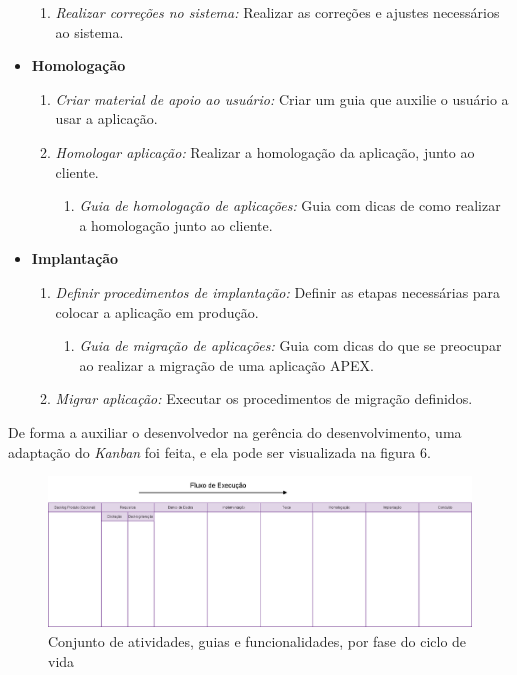 \begin{itemize}
\begin{enumerate}
\item \textit{Realizar correções no sistema:} Realizar as correções e ajustes necessários ao sistema.
\end{enumerate}
\item \textbf{Homologação}
\begin{enumerate}
\item \textit{Criar material de apoio ao usuário:} Criar um guia que auxilie o usuário a usar a aplicação.
\item \textit{Homologar aplicação:} Realizar a homologação da aplicação, junto ao cliente.
\begin{enumerate}
\item \textit{Guia de homologação de aplicações:} Guia com dicas de como realizar a homologação junto ao cliente.
\end{enumerate}
\end{enumerate}
\item \textbf{Implantação}
\begin{enumerate}
\item \textit{Definir procedimentos de implantação:} Definir as etapas necessárias para colocar a aplicação em produção.
\begin{enumerate}
\item \textit{Guia de migração de aplicações:} Guia com dicas do que se preocupar ao realizar a migração de uma aplicação APEX.
\end{enumerate}
\item \textit{Migrar aplicação:} Executar os procedimentos de migração definidos.
\end{enumerate}
\end{itemize}
De forma a auxiliar o desenvolvedor na gerência do desenvolvimento, uma adaptação do \textit{Kanban} foi feita, e ela pode ser visualizada na figura 6. \clearpage

\begin{landscape}
\vspace*{3cm}
\begin{figure}[!htb]
	\centering
		\includegraphics[scale=0.35]{figuras/kanban}
	\caption{Conjunto de atividades, guias e funcionalidades, por fase do ciclo de vida}
\end{figure}
\end{landscape}

